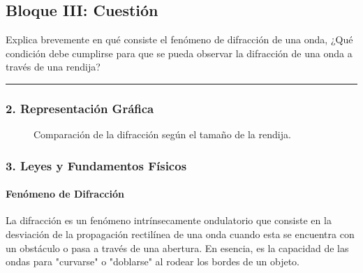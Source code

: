 \newpage

\subsection{Bloque III: Cuestión}
\label{subsec:A3_2011_jun_ord}

\begin{cajaenunciado}
Explica brevemente en qué consiste el fenómeno de difracción de una onda, ¿Qué condición debe cumplirse para que se pueda observar la difracción de una onda a través de una rendija?
\end{cajaenunciado}
\hrule

\subsubsection*{2. Representación Gráfica}
\begin{figure}[H]
    \centering
    \caption{Comparación de la difracción según el tamaño de la rendija.}
\end{figure}

\subsubsection*{3. Leyes y Fundamentos Físicos}
\paragraph{Fenómeno de Difracción}
La difracción es un fenómeno intrínsecamente ondulatorio que consiste en la desviación de la propagación rectilínea de una onda cuando esta se encuentra con un obstáculo o pasa a través de una abertura. En esencia, es la capacidad de las ondas para "curvarse" o "doblarse" al rodear los bordes de un objeto.

